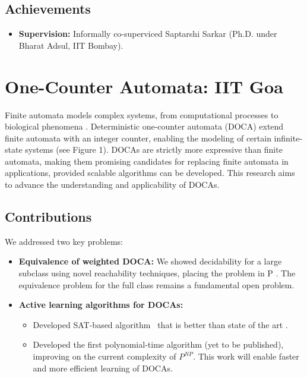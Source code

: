 \documentclass[11pt,a4paper,sans]{moderncv} %
\begin{document}
\subsection{Achievements}
\begin{itemize}
    \item \textbf{Supervision:} Informally co-superviced Saptarshi Sarkar (Ph.D. under Bharat Adsul, IIT Bombay).
\end{itemize}


\section{One-Counter Automata: IIT Goa}
Finite automata models complex systems, from computational processes \cite{vardi95} to biological phenomena \cite{Barto75}. Deterministic one-counter automata (DOCA) extend finite automata with an integer counter, enabling the modeling of certain infinite-state systems (see Figure 1). DOCAs are strictly more expressive than finite automata, making them promising candidates for replacing finite automata in applications, provided scalable algorithms can be developed. This research aims to advance the understanding and applicability of DOCAs.

\subsection{Contributions}
We addressed two key problems:
\begin{itemize}
    \item \textbf{Equivalence of weighted DOCA:} We showed decidability for a large subclass using novel reachability techniques, placing the problem in P \cite{fsttcs23,icla25}. The equivalence problem for the full class remains a fundamental open problem.
    \item \textbf{Active learning algorithms for DOCAs:}
    \begin{itemize}
    \item Developed SAT-based algorithm~\cite{learning24} that is better than state of the art \cite{gaetan}.
    \item Developed the first polynomial-time algorithm (yet to be published), improving on the current complexity of $P^{NP}$. This work will enable faster and more efficient learning of DOCAs.
    \end{itemize}
\end{itemize}
\end{document}
